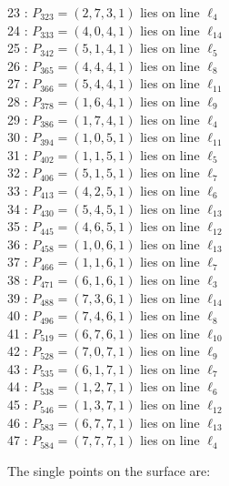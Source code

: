 \documentclass{article}
\begin{document}
{\begin{multicols}{2}
23 : $P_{323}=( 2, 7, 3, 1 )$ lies on line $\ell_{4}$\\
24 : $P_{333}=( 4, 0, 4, 1 )$ lies on line $\ell_{14}$\\
25 : $P_{342}=( 5, 1, 4, 1 )$ lies on line $\ell_{5}$\\
26 : $P_{365}=( 4, 4, 4, 1 )$ lies on line $\ell_{8}$\\
27 : $P_{366}=( 5, 4, 4, 1 )$ lies on line $\ell_{11}$\\
28 : $P_{378}=( 1, 6, 4, 1 )$ lies on line $\ell_{9}$\\
29 : $P_{386}=( 1, 7, 4, 1 )$ lies on line $\ell_{4}$\\
30 : $P_{394}=( 1, 0, 5, 1 )$ lies on line $\ell_{11}$\\
31 : $P_{402}=( 1, 1, 5, 1 )$ lies on line $\ell_{5}$\\
32 : $P_{406}=( 5, 1, 5, 1 )$ lies on line $\ell_{7}$\\
33 : $P_{413}=( 4, 2, 5, 1 )$ lies on line $\ell_{6}$\\
34 : $P_{430}=( 5, 4, 5, 1 )$ lies on line $\ell_{13}$\\
35 : $P_{445}=( 4, 6, 5, 1 )$ lies on line $\ell_{12}$\\
36 : $P_{458}=( 1, 0, 6, 1 )$ lies on line $\ell_{13}$\\
37 : $P_{466}=( 1, 1, 6, 1 )$ lies on line $\ell_{7}$\\
38 : $P_{471}=( 6, 1, 6, 1 )$ lies on line $\ell_{3}$\\
39 : $P_{488}=( 7, 3, 6, 1 )$ lies on line $\ell_{14}$\\
40 : $P_{496}=( 7, 4, 6, 1 )$ lies on line $\ell_{8}$\\
41 : $P_{519}=( 6, 7, 6, 1 )$ lies on line $\ell_{10}$\\
42 : $P_{528}=( 7, 0, 7, 1 )$ lies on line $\ell_{9}$\\
43 : $P_{535}=( 6, 1, 7, 1 )$ lies on line $\ell_{7}$\\
44 : $P_{538}=( 1, 2, 7, 1 )$ lies on line $\ell_{6}$\\
45 : $P_{546}=( 1, 3, 7, 1 )$ lies on line $\ell_{12}$\\
46 : $P_{583}=( 6, 7, 7, 1 )$ lies on line $\ell_{13}$\\
47 : $P_{584}=( 7, 7, 7, 1 )$ lies on line $\ell_{4}$\\
\end{multicols}
The single points on the surface are:\\
}
\end{document}
